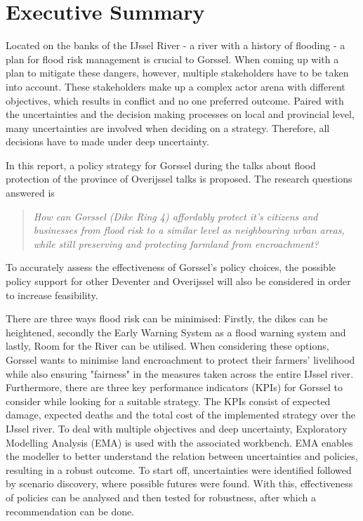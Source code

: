 \section*{Executive Summary}
\label{s:exec_summ}
\begin{multicols}{2}

Located on the banks of the IJssel River - a river with a history of flooding - a plan for flood risk management is crucial to Gorssel. When coming up with a plan to mitigate these dangers, however, multiple stakeholders have to be taken into account. These stakeholders make up a complex actor arena with different objectives, which results in conflict and no one preferred outcome. Paired with the uncertainties and the decision making processes on local and provincial level, many uncertainties are involved when deciding on a strategy. Therefore, all decisions have to made under deep uncertainty. 

In this report, a policy strategy for Gorssel during the talks about flood protection of the province of Overijssel talks is proposed. The research questions answered is \vspace*{\fill} 
\begin{quote} 
\centering 
\textit{How can Gorssel (Dike Ring 4) affordably protect it’s citizens and businesses from flood risk to a similar level as neighbouring urban areas, while still preserving and protecting farmland from encroachment?}
\end{quote}
\vspace*{\fill}
To accurately assess the effectiveness of Gorssel's policy choices, the possible policy support for other Deventer and Overijssel will also be considered in order to increase feasibility. 

\bigskip

There are three ways flood risk can be minimised: Firstly, the dikes can be heightened, secondly the Early Warning System as a flood warning system and lastly, Room for the River can be utilised. When considering these options, Gorssel wants to minimise land encroachment to protect their farmers' livelihood while also ensuring "fairness" in the measures taken across the entire IJssel river. Furthermore, there are three key performance indicators (KPIs) for Gorssel to consider while looking for a suitable strategy. The KPIs consist of expected damage, expected deaths and the total cost of the implemented strategy over the IJssel river. To deal with multiple objectives and deep uncertainty, Exploratory Modelling Analysis (EMA) is used with the associated workbench. EMA enables the modeller to better understand the relation between uncertainties and policies, resulting in a robust outcome. To start off, uncertainties were identified followed by scenario discovery, where possible futures were found. With this, effectiveness of policies can be analysed and then tested for robustness, after which a recommendation can be done. 


\end{multicols}
